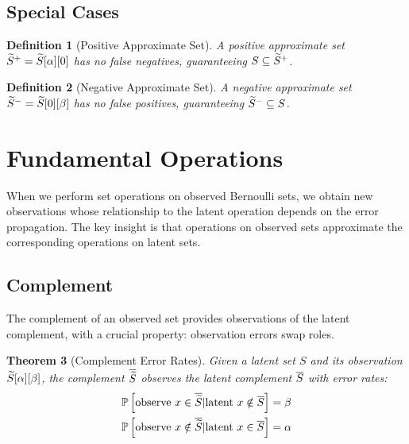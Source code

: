 \documentclass[11pt,final,hidelinks]{article}
\newtheorem{theorem}{Theorem}[section]
\newtheorem{definition}[theorem]{Definition}
\begin{document}
\subsection{Special Cases}

\begin{definition}[Positive Approximate Set]
A positive approximate set $\widetilde{S}^+ = \widetilde{S}[\alpha][0]$ has no false negatives, guaranteeing $S \subseteq \widetilde{S}^+$.
\end{definition}

\begin{definition}[Negative Approximate Set]
A negative approximate set $\widetilde{S}^- = \widetilde{S}[0][\beta]$ has no false positives, guaranteeing $\widetilde{S}^- \subseteq S$.
\end{definition}

\section{Fundamental Operations}

When we perform set operations on observed Bernoulli sets, we obtain new observations whose relationship to the latent operation depends on the error propagation. The key insight is that operations on observed sets approximate the corresponding operations on latent sets.

\subsection{Complement}

The complement of an observed set provides observations of the latent complement, with a crucial property: observation errors swap roles.

\begin{theorem}[Complement Error Rates]
Given a latent set $S$ and its observation $\widetilde{S}[\alpha][\beta]$, the complement $\overline{\widetilde{S}}$ observes the latent complement $\overline{S}$ with error rates:
\begin{align}
\mathbb{P}\left[\text{observe } x \in \overline{\widetilde{S}} | \text{latent } x \notin \overline{S}\right] &= \beta \\
\mathbb{P}\left[\text{observe } x \notin \overline{\widetilde{S}} | \text{latent } x \in \overline{S}\right] &= \alpha
\end{align}
\end{theorem}
\end{document}
